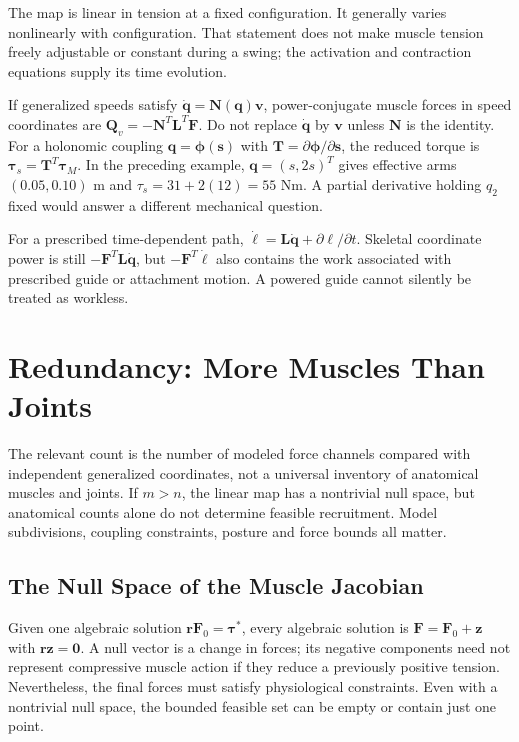The map is linear in tension at a fixed configuration. It generally varies nonlinearly with configuration. That statement does not make muscle tension freely adjustable or constant during a swing; the activation and contraction equations supply its time evolution.

If generalized speeds satisfy $\dot{\bm q}=\bm N(\bm q)\bm v$, power-conjugate muscle forces in speed coordinates are $\bm Q_v=-\bm N^T\bm L^T\bm F$. Do not replace $\dot{\bm q}$ by $\bm v$ unless $\bm N$ is the identity. For a holonomic coupling $\bm q=\bm\phi(\bm s)$ with $\bm T=\partial\bm\phi/\partial\bm s$, the reduced torque is $\bm\tau_s=\bm T^T\bm\tau_M$. In the preceding example, $\bm q=(s,2s)^T$ gives effective arms $(0.05,0.10)$ m and $\tau_s=31+2(12)=55$ Nm. A partial derivative holding $q_2$ fixed would answer a different mechanical question.

For a prescribed time-dependent path, $\dot{\bm\ell}=\bm L\dot{\bm q}+\partial\bm\ell/\partial t$. Skeletal coordinate power is still $-\bm F^T\bm L\dot{\bm q}$, but $-\bm F^T\dot{\bm\ell}$ also contains the work associated with prescribed guide or attachment motion. A powered guide cannot silently be treated as workless.

\section{Redundancy: More Muscles Than Joints}
\label{sec:redundancy}

The relevant count is the number of modeled force channels compared with independent generalized coordinates, not a universal inventory of anatomical muscles and joints. If $m>n$, the linear map has a nontrivial null space, but anatomical counts alone do not determine feasible recruitment. Model subdivisions, coupling constraints, posture and force bounds all matter.

\subsection{The Null Space of the Muscle Jacobian}

Given one algebraic solution $\bm r\bm F_0=\bm\tau^*$, every algebraic solution is $\bm F=\bm F_0+\bm z$ with $\bm r\bm z=\bm0$. A null vector is a change in forces; its negative components need not represent compressive muscle action if they reduce a previously positive tension. Nevertheless, the final forces must satisfy physiological constraints. Even with a nontrivial null space, the bounded feasible set can be empty or contain just one point.

